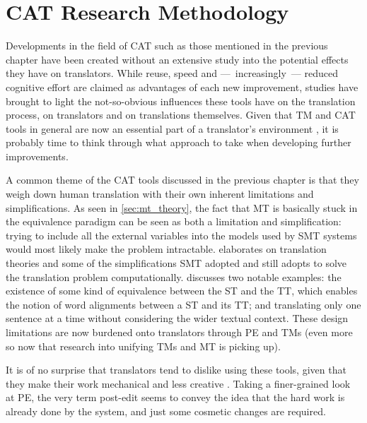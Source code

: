 
\chapter{CAT Research Methodology} %
\label{ch:methodology}

\noindent Developments in the field of \ac{CAT} such as those mentioned in the previous chapter have been created without an extensive study into the potential effects they have on translators. While reuse, speed and ---~increasingly~--- reduced cognitive effort are claimed as advantages of each new improvement, studies have brought to light the not-so-obvious influences these tools have on the translation process, on translators and on translations themselves. Given that \ac{TM} and \ac{CAT} tools in general are now an essential part of a translator's environment \parencite{o2012translation}, it is probably time to think through what approach to take when developing further improvements.

A common theme of the \ac{CAT} tools discussed in the previous chapter is that they weigh down human translation with their own inherent limitations and simplifications. As seen in \autoref{sec:mt_theory}, the fact that \ac{MT} is basically stuck in the equivalence paradigm can be seen as both a limitation and simplification: trying to include all the external variables into the models used by \ac{SMT} systems would most likely make the problem intractable. \textcite{hardmeier2014discourse} elaborates on translation theories and some of the simplifications \ac{SMT} adopted and still adopts to solve the translation problem computationally. \textcite{hardmeier2014discourse} discusses two notable examples: the existence of some kind of equivalence between the \ac{ST} and the \ac{TT}, which enables the notion of word alignments between a \ac{ST} and its \ac{TT}; and translating only one sentence at a time without considering the wider textual context. These design limitations are now burdened onto translators through \ac{PE} and \ac{TM}s (even more so now that research into unifying \ac{TM}s and \ac{MT} is picking up).

It is of no surprise that translators tend to dislike using these tools, given that they make their work mechanical and less creative \parencite{christensen2011impact}. Taking a finer-grained look at \ac{PE}, the very term post-edit seems to convey the idea that the hard work is already done by the system, and just some cosmetic changes are required.

